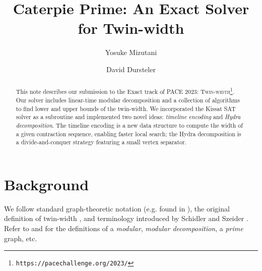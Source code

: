 \documentclass[a4paper,UKenglish,cleveref, autoref, thm-restate]{lipics-v2021}
\title{Caterpie Prime: An Exact Solver for Twin-width} %
\author{Yosuke Mizutani}{\universityOfUtah}{yos@cs.utah.edu}{https://orcid.org/0000-0002-9847-4890}{}
\author{David Dursteler}{\universityOfUtah}{u1161522@utah.edu}{https://orcid.org/0009-0000-6471-1504}{}
\begin{document}
\maketitle

\begin{abstract}
This note describes our submission to the Exact track of PACE 2023:
 \textsc{Twin-width}\footnote{%
\texttt{https://pacechallenge.org/2023/}}.
%
Our solver includes linear-time modular decomposition and
a collection of algorithms to find lower and upper bounds of the twin-width.
%
We incorporated the \textsf{Kissat} SAT solver \cite{biere_gimsatul_2022} as a subroutine
and implemented two novel ideas:
\emph{timeline encoding} and \emph{Hydra decomposition}.
%
The timeline encoding is a new data structure to compute the width of a given contraction
sequence, enabling faster local search;
the Hydra decomposition is a divide-and-conquer strategy featuring a small vertex separator.
\end{abstract}

\section{Background}
\label{sec:background}

We follow standard graph-theoretic notation (e.g. found in \cite{diestel2017graph}),
the original definition of twin-width \cite{bonnet_twin-width_2020,bonnet_twin-width_2021,
bonnet_twin-width_2021-1},
and terminology introduced by Schidler and Szeider \cite{schidler_sat_2021}.
%
Refer to \cite{habib_survey_2010} and \cite{tedder_simple_2008} for the definitions of
a \emph{modular}, \emph{modular decomposition}, a \emph{prime} graph, etc.
\end{document}
